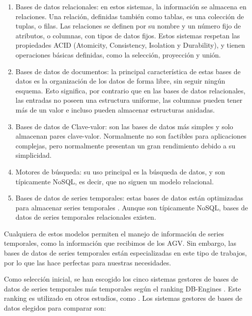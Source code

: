 \begin{enumerate}
    \item Bases de datos relacionales: en estos sistemas, la información se almacena en relaciones. Una relación,
        definidas también como tablas, es una colección de tuplas, o filas. Las relaciones se definen por su nombre
        y un número fijo de atributos, o columnas, con tipos de datos fijos. Estos sistemas respetan las propiedades
        ACID (Atomicity, Consistency, Isolation y Durability), y tienen operaciones básicas definidas, como la selección,
        proyección y unión.
    \item Bases de datos de documentos: la principal característica de estas bases de datos es la organización de los datos
        de forma libre, sin seguir ningún esquema. Esto significa, por contrario que en las bases de datos relacionales,
        las entradas no poseen una estructura uniforme, las columnas pueden tener más de un valor e incluso pueden almacenar
        estructuras anidadas.
    \item Bases de datos de Clave-valor: son las bases de datos más simples y solo almacenan pares clave-valor. Normalmente
        no son factibles para aplicaciones complejas, pero normalmente presentan un gran rendimiento debido a su
        simplicidad.
    \item Motores de búsqueda: su uso principal es la búsqueda de datos, y son típicamente NoSQL, es decir, que no siguen
        un modelo relacional.
    \item Bases de datos de series temporales: estas bases de datos están optimizadas para almacenar series temporales \cite{influx:timeseries}.
        Aunque son típicamente NoSQL, bases de datos de series temporales relacionales existen.
\end{enumerate}

Cualquiera de estos modelos permiten el manejo de información de series temporales, como la información que recibimos
de los AGV. Sin embargo, las bases de datos de series temporales están especializadas en este tipo de trabajos, por lo que
las hace perfectas para nuestras necesidades.

Como selección inicial, se han escogido los cinco sistemas gestores de bases de datos de series temporales más temporales
según el ranking DB-Engines \cite{dbengines:rankingTSDBMS}. Este ranking es utilizado en otros estudios, como \cite{10.1007/978-3-030-50426-7_28}.
Los sistemas gestores de bases de datos elegidos para comparar son:

